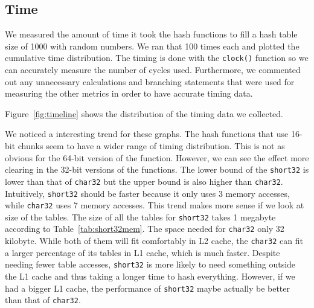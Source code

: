 \documentclass[11pt]{article}
\begin{document}
\subsection{Time}
We measured the amount of time it took the hash functions to fill a hash table
size of 1000 with random numbers. We ran that 100 times each and plotted the
cumulative time distribution. The timing is done with the \texttt{clock()} 
function so we can accurately measure the number of cycles used. 
Furthermore, we commented out any unnecessary calculations and 
branching statements that were used for measuring the other metrics 
in order to have accurate timing data.

Figure~\ref{fig:timeline} shows the distribution of the timing data we collected.

We noticed a interesting trend for these graphs.
The hash functions that use 16-bit chunks seem to have a wider range 
of timing distribution. This is not as obvious  for the 64-bit version of the function.
However, we can see the effect more clearing in the 32-bit versions of the functions.
The lower bound of the \texttt{short32} is lower than that of \texttt{char32} 
but the upper bound is also higher than \texttt{char32}. Intuitively,  \texttt{short32}
should be faster because it only uses 3 memory accesses, 
while \texttt{char32} uses 7 memory accesses. This trend makes 
more sense if we look at size of the tables. The size of all the tables for \texttt{short32}
takes 1 megabyte according to Table~\ref{tab:short32mem}. The space needed 
for \texttt{char32} only 32 kilobyte. While both of them will fit comfortably in L2 cache,
the \texttt{char32} can fit a larger percentage of its tables in L1 cache, which is much faster.
Despite needing fewer table accesses, \texttt{short32} is more likely to need 
something outside the L1 cache and thus taking a longer time to hash everything.
However, if we had a bigger L1 cache, the performance of \texttt{short32} maybe actually
be better than that of \texttt{char32}.
\end{document}
